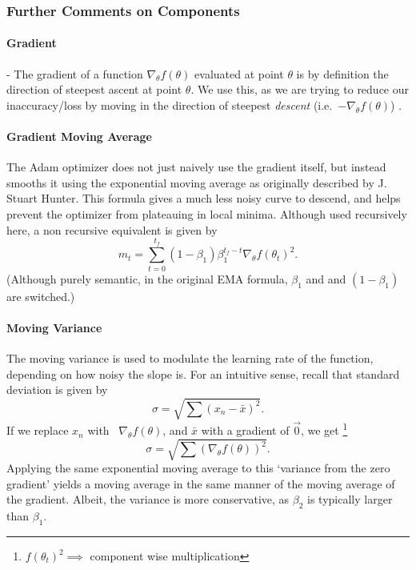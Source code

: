 \documentclass[titlepage,letterpaper]{article}
\begin{document}
\subsubsection{Further Comments on Components}



\paragraph{Gradient} - The gradient of a function $\nabla_\theta f(\theta)$ evaluated at point $\theta$ is by definition the direction of steepest ascent at point $\theta$. We use this, as we are trying to reduce our inaccuracy/loss by moving in the direction of steepest \textit{descent} \mbox{(i.e. $-\nabla_\theta f(\theta)$)} \cite{gradient}.

\paragraph{Gradient Moving Average}
The Adam optimizer does not just naively use the gradient itself, but instead smooths it using the exponential moving average as originally described by J. Stuart Hunter.\cite{EMA} This formula gives a much less noisy curve to descend, and helps prevent the optimizer from plateauing in local minima. Although used recursively here, a non recursive equivalent is given by
\[m_t = \sum_{t=0}^{t_f} \left(1-\beta_1\right) \beta_1^{t_f-t}\nabla_\theta f\left(\theta_{t}\right)^2.\]
(Although purely semantic, in the original EMA formula, \(\beta_1\) and and \(\left(1-\beta_1\right)\) are switched.)

\paragraph{Moving Variance}
The moving variance is used to modulate the learning rate of the function, depending on how noisy the slope is. For an intuitive sense, 
recall that standard deviation is given by
\[\sigma = \sqrt{\sum \left(x_n - \bar{x}\right)^2}.\]
If we replace \(x_n\) with \ \(\nabla_\theta f(\theta)\), and \(\bar{x}\) with a gradient of \(\vec{0}\), we get \footnote{\(f\left(\theta_{t}\right)^2 \implies \) component wise multiplication}
\[\sigma = \sqrt{\sum \left(\nabla_\theta f(\theta)\right)^2}.\]
Applying the same exponential moving average to this `variance from the zero gradient' yields a moving average in the same manner of the moving average of the gradient. Albeit, the variance is more conservative, as \(\beta_2\) is typically larger than \(\beta_1\)\cite{adam}.
\end{document}
